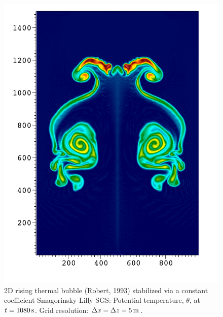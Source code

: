 \documentclass{article}
\begin{document}
{\begin{figure}[htbp]
\includegraphics[width=\textwidth]{figures/RTB-Robert--smgo-5mX5m-1080s0000.png}
\caption{2D rising thermal bubble (Robert, 1993) stabilized via a constant coefficient Smagorinsky-Lilly SGS: Potential temperature, $\theta$, at $t=1080\,{\rm s}$. Grid resolution: $\Delta x = \Delta z = 5\,{\rm m}$.}
\label{fig:benchmarks/robert5msmago}
\end{figure}

}
\end{document}
